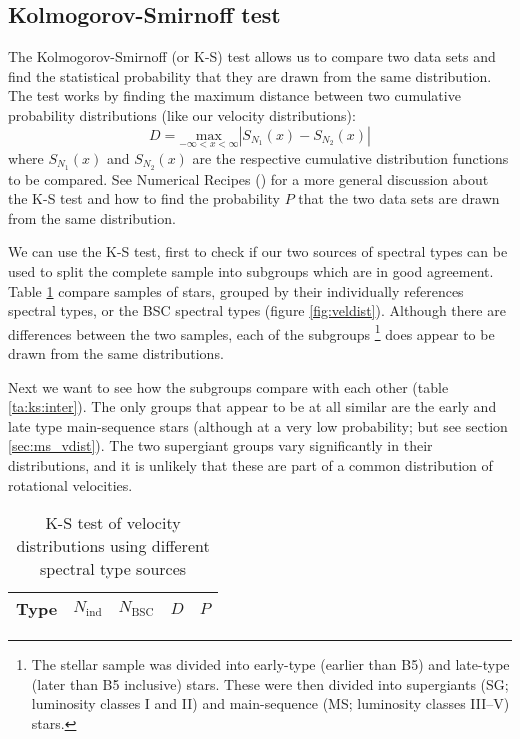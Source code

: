 \subsection{Kolmogorov-Smirnoff test}
\label{sec:ks}

The Kolmogorov-Smirnoff (or K-S) test allows us to compare two
data sets and find the statistical probability that they are drawn
from the same distribution. The test works by finding the maximum
distance between two cumulative probability distributions (like our
velocity distributions):
\begin{equation*}
D = \underset{-\infty < x < \infty}{\mathrm{max}} |S_{N_1}(x) -
S_{N_2}(x)|
\end{equation*}
where $S_{N_1}(x)$ and $S_{N_2}(x)$ are the respective cumulative
distribution functions to be compared. See Numerical Recipes
(\cite{nr}) for a more general discussion about the K-S test and how
to find the probability $P$ that the two data sets are drawn from the
same distribution.

We can use the K-S test, first to check if our two sources of spectral
types can be used to split the complete sample into subgroups which
are in good agreement. Table \ref{ta:ks:spectypes} compare samples of
stars, grouped by their individually references spectral types, or the
BSC spectral types (figure \ref{fig:veldist}). Although there are
differences between the two samples, each of the subgroups%
%
\footnote{The stellar sample was divided into early-type (earlier than
B5) and late-type (later than B5 inclusive) stars. These were then
divided into supergiants (SG; luminosity classes I and II) and
main-sequence (MS; luminosity classes III--V) stars.}
%
does appear to be drawn from the
same distributions.

Next we want to see how the subgroups compare with each other (table
\ref{ta:ks:inter}). The only groups that appear to be at all similar
are the early and late type main-sequence stars (although at a very
low probability; but see section \ref{sec:ms_vdist}). The two
supergiant groups vary significantly in their distributions, and it is
unlikely that these are part of a common distribution of rotational
velocities.

\begin{table} %
\begin{center}
\caption{K-S test of velocity distributions using different spectral type 
\label{ta:ks:spectypes}
sources}
\vspace{\abovecaptionskip}
\begin{tabular}{llrrrr}
\hline\hline
\multicolumn{2}{c}{Type} & \multicolumn{1}{c}{$N_\mathrm{ind}$} &
\multicolumn{1}{c}{$N_\mathrm{BSC}$} & \multicolumn{1}{c}{$D$} &
\multicolumn{1}{c}{$P$} \\
\hline

\hline\hline
\end{tabular}
\end{center}
\end{table} %

